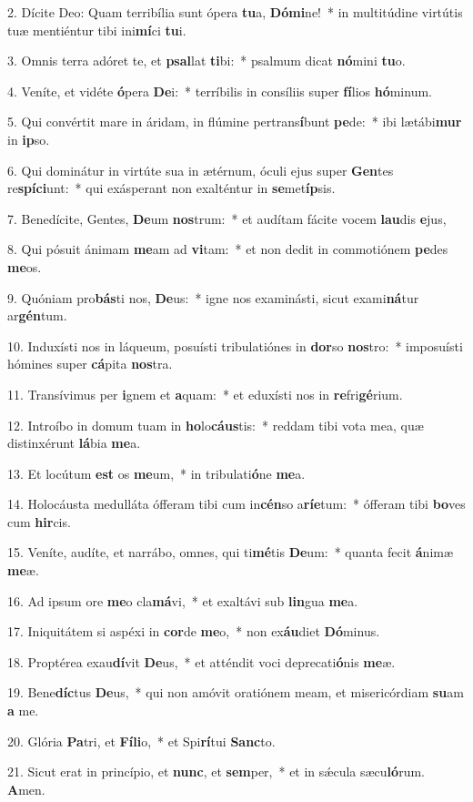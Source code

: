 2. Dícite Deo: Quam terribília sunt ópera \textbf{tu}a, \textbf{Dó}\textbf{mi}ne!~*  in multitúdine virtútis tuæ mentiéntur tibi ini\textbf{mí}ci \textbf{tu}i.\

3. Omnis terra adóret te, et \textbf{psal}lat \textbf{ti}bi:~*  psalmum dicat \textbf{nó}mini \textbf{tu}o.\

4. Veníte, et vidéte \textbf{ó}pera \textbf{De}i:~*  terríbilis in consíliis super \textbf{fí}lios \textbf{hó}minum.\

5. Qui convértit mare in áridam, in flúmine pertrans\textbf{í}bunt \textbf{pe}de:~*  ibi lætábi\textbf{mur} in \textbf{ip}so.\

6. Qui dominátur in virtúte sua in ætérnum, óculi ejus super \textbf{Gen}tes re\textbf{spí}\textbf{ci}unt:~*  qui exásperant non exalténtur in \textbf{se}met\textbf{íp}sis.\

7. Benedícite, Gentes, \textbf{De}um \textbf{nos}trum:~*  et audítam fácite vocem \textbf{lau}dis \textbf{e}jus,\

8. Qui pósuit ánimam \textbf{me}am ad \textbf{vi}tam:~*  et non dedit in commotiónem \textbf{pe}des \textbf{me}os.\

9. Quóniam pro\textbf{bás}ti nos, \textbf{De}us:~*  igne nos examinásti, sicut exami\textbf{ná}tur ar\textbf{gén}tum.\

10. Induxísti nos in láqueum, posuísti tribulatiónes in \textbf{dor}so \textbf{nos}tro:~*  imposuísti hómines super \textbf{cá}pita \textbf{nos}tra.\

11. Transívimus per \textbf{i}gnem et \textbf{a}quam:~*  et eduxísti nos in \textbf{re}fri\textbf{gé}rium.\

12. Introíbo in domum tuam in \textbf{ho}lo\textbf{cáus}tis:~*  reddam tibi vota mea, quæ distinxérunt \textbf{lá}bia \textbf{me}a.\

13. Et locútum \textbf{est} os \textbf{me}um,~*  in tribulati\textbf{ó}ne \textbf{me}a.\

14. Holocáusta medulláta ófferam tibi cum in\textbf{cén}so a\textbf{rí}\textbf{e}tum:~*  ófferam tibi \textbf{bo}ves cum \textbf{hir}cis.\

15. Veníte, audíte, et narrábo, omnes, qui ti\textbf{mé}tis \textbf{De}um:~*  quanta fecit \textbf{á}nimæ \textbf{me}æ.\

16. Ad ipsum ore \textbf{me}o cla\textbf{má}vi,~*  et exaltávi sub \textbf{lin}gua \textbf{me}a.\

17. Iniquitátem si aspéxi in \textbf{cor}de \textbf{me}o,~*  non ex\textbf{áu}diet \textbf{Dó}minus.\

18. Proptérea exau\textbf{dí}vit \textbf{De}us,~*  et atténdit voci deprecati\textbf{ó}nis \textbf{me}æ.\

19. Bene\textbf{díc}tus \textbf{De}us,~*  qui non amóvit oratiónem meam, et misericórdiam \textbf{su}am \textbf{a} me.\

20. Glória \textbf{Pa}tri, et \textbf{Fí}\textbf{li}o,~*  et Spi\textbf{rí}tui \textbf{Sanc}to.\

21. Sicut erat in princípio, et \textbf{nunc}, et \textbf{sem}per,~*  et in sǽcula sæcu\textbf{ló}rum. \textbf{A}men.\


